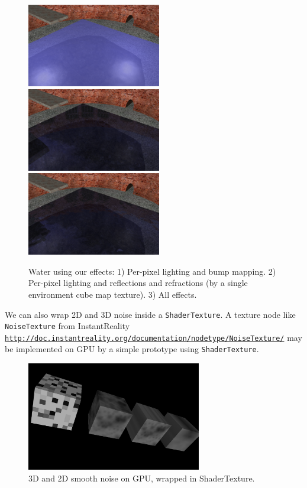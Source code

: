 \documentclass{acmsiggraph}                     %
\newcommand*{\myhref}[2]{\texttt{\href{#1}{\nolinkurl{#2}}}}
\begin{document}
\begin{figure}[t]
  \centering
  \includegraphics[width=2.3in]{water_shaders_1}
  \includegraphics[width=2.3in]{water_shaders_2}
  \includegraphics[width=2.3in]{water_shaders_3}
  \caption{Water using our effects: 1) Per-pixel lighting and bump mapping.
2) Per-pixel lighting and reflections and refractions (by a single environment cube map texture).
3) All effects.}
\end{figure}

We can also wrap 2D and 3D noise inside a \texttt{ShaderTexture}.
A texture node like \texttt{NoiseTexture} from InstantReality
\myhref{http://doc.instantreality.org/documentation/nodetype/NoiseTexture/}{http://doc.instantreality.org/documentation/nodetype/NoiseTexture/}
may be implemented on GPU by a simple prototype using \texttt{ShaderTexture}.

\begin{figure}[H]
  \centering
  \includegraphics[width=3in]{noise}
  \caption{3D and 2D smooth noise on GPU, wrapped in ShaderTexture.}
\end{figure}
\end{document}
